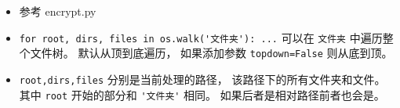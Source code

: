 
\begin{issues}
\issueDraft
\end{issues}

\begin{itemize}
\item 参考 encrypt.py
\item \verb`for root, dirs, files in os.walk('文件夹'): ...` 可以在 \verb`文件夹` 中遍历整个文件树。 默认从顶到底遍历， 如果添加参数 \verb`topdown=False` 则从底到顶。
\item \verb`root,dirs,files` 分别是当前处理的路径， 该路径下的所有文件夹和文件。 其中 \verb`root` 开始的部分和 \verb`'文件夹'` 相同。 如果后者是相对路径前者也会是。
\end{itemize}
